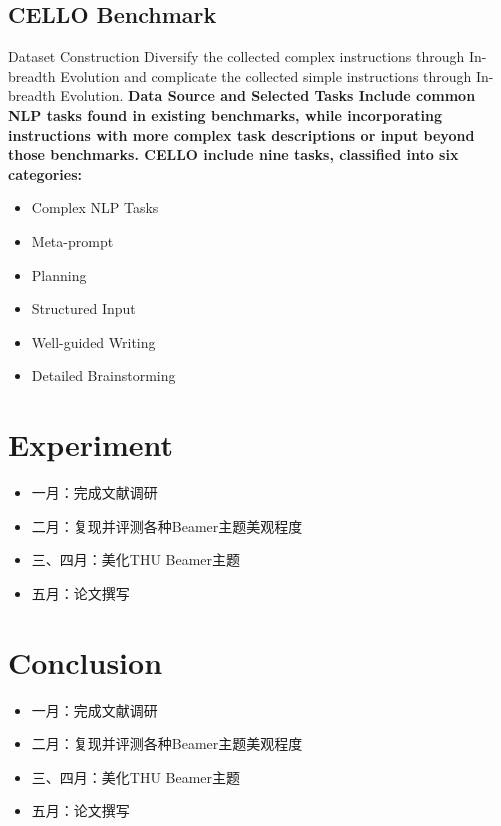\documentclass{beamer}
\begin{document}
\subsection{CELLO Benchmark}

\begin{frame}{Dataset Construction}
    Diversify the collected complex instructions through In-breadth Evolution and complicate the collected simple instructions through In-breadth Evolution.
    \newline
    \large\bfseries{Data Source and Selected Tasks}
    \newline
    \normalfont
    Include common NLP tasks found in existing benchmarks, while incorporating instructions with more complex task descriptions or input beyond those benchmarks. CELLO include nine tasks, classified into six categories:
    \begin{itemize}
        \item {Complex NLP Tasks}
        \item {Meta-prompt}
        \item {Planning}
        \item {Structured Input}
        \item {Well-guided Writing}
        \item {Detailed Brainstorming}
    \end{itemize}
\end{frame}

\section{Experiment}

\begin{frame}
    \begin{itemize}
        \item 一月：完成文献调研
        \item 二月：复现并评测各种Beamer主题美观程度
        \item 三、四月：美化THU Beamer主题
        \item 五月：论文撰写
    \end{itemize}
\end{frame}

\section{Conclusion}

\begin{frame}
    \begin{itemize}
        \item 一月：完成文献调研
        \item 二月：复现并评测各种Beamer主题美观程度
        \item 三、四月：美化THU Beamer主题
        \item 五月：论文撰写
    \end{itemize}
\end{frame}
\end{document}
